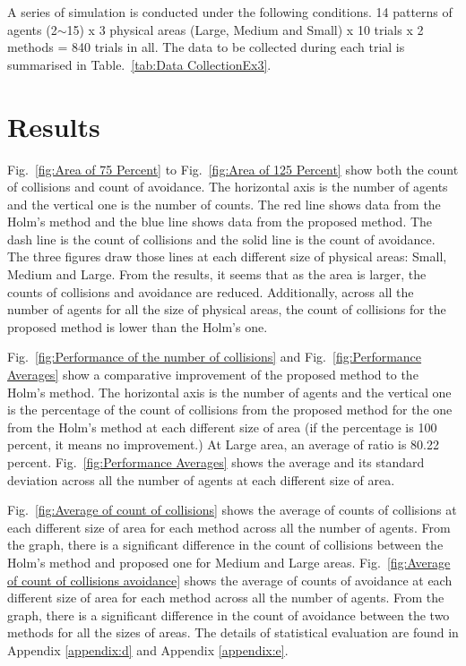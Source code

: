 A series of simulation is conducted under the following conditions. 14 patterns of agents (2$\sim$15) x 3 physical areas (Large, Medium and Small) x 10 trials x 2 methods = 840 trials in all. The data to be collected during each trial is summarised in Table.~\ref{tab:Data CollectionEx3}.

\newpage

\section{Results}
Fig.~\ref{fig:Area of 75 Percent} to Fig.~\ref{fig:Area of 125 Percent} show both the count of collisions and count of avoidance. The horizontal axis is the number of agents and the vertical one is the number of counts. The red line shows data from the Holm's method and the blue line shows data from the proposed method. The dash line is the count of collisions and the solid line is the count of avoidance. The three figures draw those lines at each different size of physical areas: Small, Medium and Large. From the results, it seems that as the area is larger, the counts of collisions and avoidance are reduced. Additionally, across all the number of agents for all the size of physical areas, the count of collisions for the proposed method is lower than the Holm's one.


Fig.~\ref{fig:Performance of the number of collisions} and Fig.~\ref{fig:Performance Averages} show a comparative improvement of the proposed method to the Holm's method. The horizontal axis is the number of agents and the vertical one is the percentage of the count of collisions from the proposed method for the one from the Holm's method at each different size of area (if the percentage is 100 percent, it means no improvement.) At Large area, an average of ratio is 80.22 percent. Fig.~\ref{fig:Performance Averages} shows the average and its standard deviation across all the number of agents at each different size of area.

Fig.~\ref{fig:Average of count of collisions} shows the average of counts of collisions at each different size of area for each method across all the number of agents. From the graph, there is a significant difference in the count of collisions between the Holm's method and proposed one for Medium and Large areas.  Fig.~\ref{fig:Average of count of collisions avoidance} shows the average of counts of avoidance at each different size of area for each method across all the number of agents. From the graph,  there is a significant difference in the count of  avoidance between the two methods for all the sizes of areas. The details of statistical evaluation are found in Appendix \ref{appendix:d} and Appendix \ref{appendix:e}.

